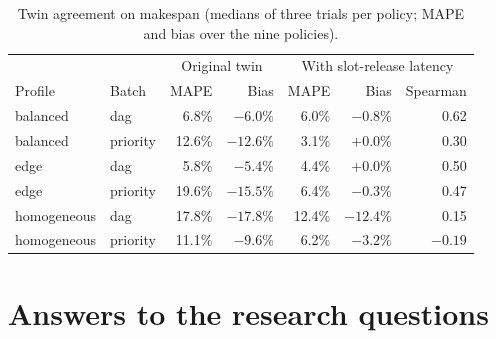 \documentclass[12pt,a4paper]{report}
\begin{document}
\begin{table}[ht]
\centering
\small
\begin{tabular}{llrr|rrr}
\toprule
 & & \multicolumn{2}{c|}{Original twin} & \multicolumn{3}{c}{With slot-release latency} \\
Profile & Batch & MAPE & Bias & MAPE & Bias & Spearman \\
\midrule
balanced & dag & 6.8\% & $-6.0\%$ & 6.0\% & $-0.8\%$ & 0.62 \\
balanced & priority & 12.6\% & $-12.6\%$ & 3.1\% & $+0.0\%$ & 0.30 \\
edge & dag & 5.8\% & $-5.4\%$ & 4.4\% & $+0.0\%$ & 0.50 \\
edge & priority & 19.6\% & $-15.5\%$ & 6.4\% & $-0.3\%$ & 0.47 \\
homogeneous & dag & 17.8\% & $-17.8\%$ & 12.4\% & $-12.4\%$ & 0.15 \\
homogeneous & priority & 11.1\% & $-9.6\%$ & 6.2\% & $-3.2\%$ & $-0.19$ \\
\bottomrule
\end{tabular}
\caption{Twin agreement on makespan (medians of three trials per policy;
MAPE and bias over the nine policies).}
\label{tab:twin-agreement}
\end{table}

\section{Answers to the research questions}
\label{sec:answers}
\end{document}
